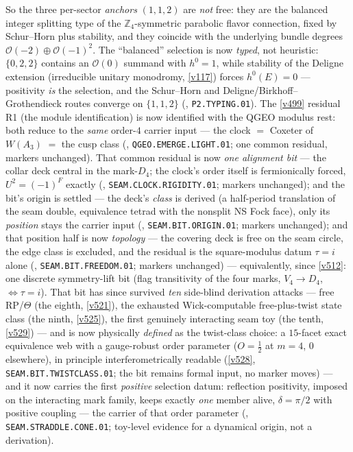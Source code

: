 \noindent So the three per-sector \emph{anchors} $(1,1,2)$ are \emph{not} free: they are the balanced
integer splitting type of the $\mathbb Z_4$-symmetric parabolic flavor connection, fixed by Schur--Horn
plus stability, and they coincide with the underlying bundle degrees $\mathcal O(-2)\oplus\mathcal O(-1)^2$.
The ``balanced'' selection is now \emph{typed}, not heuristic: $\{0,2,2\}$ contains an $\mathcal O(0)$
summand with $h^0=1$, while stability of the Deligne extension (irreducible unitary monodromy,
\vref{v117}) forces $h^0(E)=0$ --- positivity \emph{is} the selection, and the Schur--Horn and
Deligne/Birkhoff--Grothendieck routes converge on $\{1,1,2\}$
(, \texttt{P2.TYPING.01}). The \vref{v499} residual R1 (the
module identification) is now identified with the QGEO modulus rest: both reduce to the \emph{same}
order-$4$ carrier input --- the clock $=$ Coxeter of $W(A_3)$ $=$ the cusp class
(, \texttt{QGEO.EMERGE.LIGHT.01}; one common residual, markers
unchanged). That common residual is now \emph{one alignment bit} --- the collar deck central in the
mark-$D_4$; the clock's order itself is fermionically forced, $U^2=(-1)^F$ exactly
(, \texttt{SEAM.CLOCK.RIGIDITY.01}; markers unchanged); and the
bit's origin is settled --- the deck's \emph{class} is derived (a half-period translation of the
seam double, equivalence tetrad with the nonsplit NS Fock face), only its \emph{position} stays the
carrier input (, \texttt{SEAM.BIT.ORIGIN.01}; markers unchanged);
and that position half is now \emph{topology} --- the covering deck is free on the seam circle, the
edge class is excluded, and the residual is the square-modulus datum $\tau=i$ alone
(, \texttt{SEAM.BIT.FREEDOM.01}; markers unchanged) ---
equivalently, since \vref{v512}: one discrete symmetry-lift bit (flag transitivity of the four
marks, $V_4\to D_4$, $\iff\tau=i$). That bit has since survived \emph{ten} side-blind derivation
attacks --- free RP/$\Theta$ (the eighth, \vref{v521}), the exhausted Wick-computable
free-plus-twist state class (the ninth, \vref{v525}), the first genuinely interacting seam toy
(the tenth, \vref{v529}) --- and is now physically \emph{defined} as the twist-class choice:
a $15$-facet exact equivalence web with a gauge-robust order parameter ($O=\tfrac12$ at $m=4$,
$0$ elsewhere), in principle interferometrically readable (\vref{v528},
\texttt{SEAM.BIT.TWISTCLASS.01}; the bit remains formal input, no marker moves) --- and it now
carries the first \emph{positive} selection datum: reflection positivity, imposed on the
interacting mark family, keeps exactly \emph{one} member alive, $\delta=\pi/2$ with positive
coupling --- the carrier of that order parameter
(, \texttt{SEAM.STRADDLE.CONE.01}; toy-level evidence for a
dynamical origin, not a derivation).

